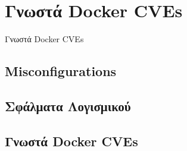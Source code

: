 \section{Γνωστά \textlatin{Docker CVEs}}
\label{knownDockerCves}

Γνωστά \textlatin{Docker CVEs}

\subsection{\textlatin{Misconfigurations}}
\subsection{Σφάλματα Λογισμικού}
\subsection{Γνωστά \textlatin{Docker CVEs}}
